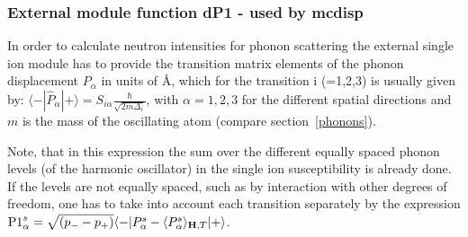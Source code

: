 
\subsubsection{External module function {\prg dP1} - used by {\prg mcdisp}}

In order to calculate neutron intensities for phonon scattering
the external single ion module has to provide the transition matrix elements of
 the phonon displacement $P_{\alpha}$ in units of \AA, which for the transition i (=1,2,3)
is usually given by:
$\langle-|\hat P_{\alpha}|+\rangle=S_{i\alpha}\frac{\hbar}{\sqrt{2m\Delta_i}}$,
with $\alpha=1,2,3$ for the different spatial directions and $m$ is the mass of the
oscillating atom (compare section~\ref{phonons}). 

Note, that in this
expression the sum over the different equally spaced phonon levels (of the harmonic oscillator)
in the single ion susceptibility is already done. If the levels are not equally spaced, such
as by interaction with other degrees of freedom, one has to take into account each transition
separately by the expression
${\rm P1}^s_{\alpha}=\sqrt{(p_--p_+)}\langle -|P^s_{\alpha}-\langle P^s_{\alpha}\rangle_{\mathbf H,T}|+\rangle$. 

